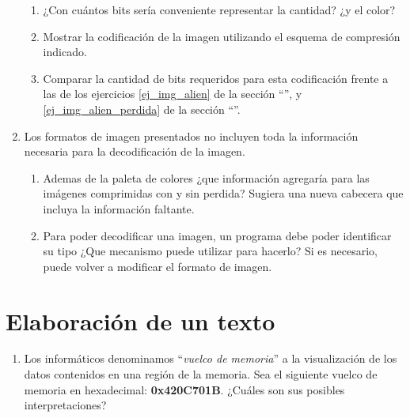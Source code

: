 \documentclass[12pt]{article}
\begin{document}
\begin{enumerate}
\begin{enumerate}
            \item ¿Con cuántos bits sería conveniente representar la cantidad?
            ¿y el color?

            \item Mostrar la codificación de la imagen utilizando el esquema
                de compresión indicado.

            \item Comparar la cantidad de bits requeridos para esta
                codificación frente a las de los ejercicios \ref{ej_img_alien} de
                la sección ``\textbf{}'', y
                \ref{ej_img_alien_perdida} de la sección
                ``\textbf{}''.

        \end{enumerate}

    \item Los formatos de imagen presentados no incluyen toda la información
        necesaria para la decodificación de la imagen.

        \begin{enumerate}

            \item Ademas de la paleta de colores ¿que información agregaría
                para las imágenes comprimidas con y sin perdida? Sugiera una
                nueva cabecera que incluya la información faltante.

            \item  Para poder decodificar una imagen, un programa debe poder
                identificar su tipo ¿Que mecanismo puede utilizar para
                hacerlo? Si es necesario, puede volver a modificar el formato
                de imagen.

        \end{enumerate}

\end{enumerate}

\section{Elaboración de un texto}

\begin{enumerate}

    \item Los informáticos denominamos ``\emph{vuelco de memoria}'' a la
        visualización de los datos contenidos en una región de la memoria. Sea
        el siguiente vuelco de memoria en hexadecimal: \textbf{0x420C701B}.
        ¿Cuáles son sus posibles interpretaciones?

\end{enumerate}
\end{document}
